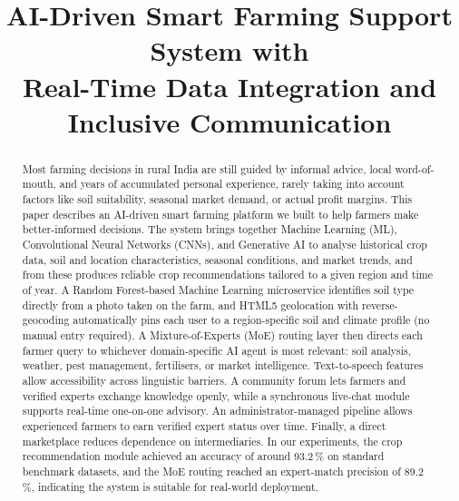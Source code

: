 \documentclass[conference]{IEEEtran}
\begin{document}
\title{AI-Driven Smart Farming Support System with\\Real-Time Data Integration and Inclusive Communication}

\author{
\and
{}
\and
{}
}

\maketitle

\begin{abstract}
Most farming decisions in rural India are still guided by informal advice,
local word-of-mouth, and years of accumulated personal experience, rarely
taking into account factors like soil suitability, seasonal market demand, or
actual profit margins. This paper describes an AI-driven smart farming platform
we built to help farmers make better-informed decisions. The system brings
together Machine Learning (ML), Convolutional Neural Networks (CNNs), and
Generative AI to analyse historical crop data, soil and location
characteristics, seasonal conditions, and market trends, and from these
produces reliable crop recommendations tailored to a given region and time of
year. A Random Forest-based Machine Learning microservice identifies soil type directly from a photo
taken on the farm, and HTML5 geolocation with reverse-geocoding automatically
pins each user to a region-specific soil and climate profile (no manual
entry required). A Mixture-of-Experts (MoE) routing layer then directs each
farmer query to whichever domain-specific AI agent is most relevant: soil
analysis, weather, pest management, fertilisers, or market intelligence. Text-to-speech features allow accessibility across linguistic barriers.
A community forum lets farmers and verified experts exchange
knowledge openly, while a synchronous live-chat module supports real-time
one-on-one advisory. An administrator-managed pipeline allows experienced
farmers to earn verified expert status over time. Finally, a direct
marketplace reduces dependence on intermediaries. In our experiments,
the crop recommendation module achieved an accuracy of around 93.2\,\% on
standard benchmark datasets, and the MoE routing reached an expert-match
precision of 89.2\,\%, indicating the system is suitable for real-world
deployment.
\end{abstract}
\end{document}
